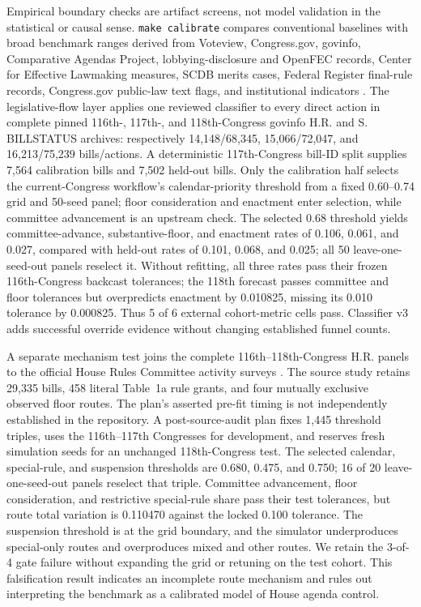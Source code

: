 \documentclass[manuscript]{acmart}
\begin{document}
Empirical boundary checks are artifact screens, not model validation in the statistical or causal sense. \texttt{make calibrate} compares conventional baselines with broad benchmark ranges derived from Voteview, Congress.gov, govinfo, Comparative Agendas Project, lobbying-disclosure and OpenFEC records, Center for Effective Lawmaking measures, SCDB merits cases, Federal Register final-rule records, Congress.gov public-law text flags, and institutional indicators \citep{Voteview2021,CongressGovData,GovinfoBillStatus2020,ComparativeAgendasProject,SenateLDA,OpenFECData,VoldenWiseman2014,VDemDataset}. The legislative-flow layer applies one reviewed classifier to every direct action in complete pinned 116th-, 117th-, and 118th-Congress govinfo H.R. and S. BILLSTATUS archives: respectively 14,148/68,345, 15,066/72,047, and 16,213/75,239 bills/actions. A deterministic 117th-Congress bill-ID split supplies 7,564 calibration bills and 7,502 held-out bills. Only the calibration half selects the current-Congress workflow's calendar-priority threshold from a fixed 0.60--0.74 grid and 50-seed panel; floor consideration and enactment enter selection, while committee advancement is an upstream check. The selected 0.68 threshold yields committee-advance, substantive-floor, and enactment rates of 0.106, 0.061, and 0.027, compared with held-out rates of 0.101, 0.068, and 0.025; all 50 leave-one-seed-out panels reselect it. Without refitting, all three rates pass their frozen 116th-Congress backcast tolerances; the 118th forecast passes committee and floor tolerances but overpredicts enactment by 0.010825, missing its 0.010 tolerance by 0.000825. Thus 5 of 6 external cohort-metric cells pass. Classifier v3 adds successful override evidence without changing established funnel counts.

A separate mechanism test joins the complete 116th--118th-Congress H.R. panels to the official House Rules Committee activity surveys \citep{HouseRulesSurvey116,HouseRulesSurvey117,HouseRulesSurvey118}. The source study retains 29,335 bills, 458 literal Table~1a rule grants, and four mutually exclusive observed floor routes. The plan's asserted pre-fit timing is not independently established in the repository. A post-source-audit plan fixes 1,445 threshold triples, uses the 116th--117th Congresses for development, and reserves fresh simulation seeds for an unchanged 118th-Congress test. The selected calendar, special-rule, and suspension thresholds are 0.680, 0.475, and 0.750; 16 of 20 leave-one-seed-out panels reselect that triple. Committee advancement, floor consideration, and restrictive special-rule share pass their test tolerances, but route total variation is 0.110470 against the locked 0.100 tolerance. The suspension threshold is at the grid boundary, and the simulator underproduces special-only routes and overproduces mixed and other routes. We retain the 3-of-4 gate failure without expanding the grid or retuning on the test cohort. This falsification result indicates an incomplete route mechanism and rules out interpreting the benchmark as a calibrated model of House agenda control.
\end{document}
